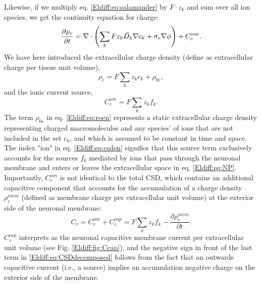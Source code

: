 Likewise, if we multiply eq. \ref{Eldiff:eq:salamander} by $F\cdot z_k$ and sum over all ion species, we get the continuity equation for charge: 
\begin{equation}
\frac{\partial \rho_e}{\partial t} =  \nabla \cdot \left (\sum_k{F z_k \tilde{D_k}{\bf \nabla} c_{k}} + \sigma_e\nabla\phi  \right)  + C_e^{ion}.
\label{Eldiff:eq:chargecontinuity}
\end{equation}
We have here introduced the extracellular charge density (define as extracellular charge per tissue unit volume), 
\begin{equation}
\rho_e = F \sum_k z_k c_k + \rho_{0e},  
\label{Eldiff:eq:roen}
\end{equation}
and the ionic current source, 
\begin{equation}
C_e^{ion} = F \sum_k z_k f_k. 
\label{Eldiff:eq:csden}
\end{equation}
The term $\rho_{0e}$ in eq. \ref{Eldiff:eq:roen} represents a static extracellular charge density representing charged macromolecules and any species' of ions that are not included in the set $c_k$, and which is assumed to be constant in time and space. The index "ion" in eq. \ref{Eldiff:eq:csden} signifies that this source term exclusively accounts for the sources $f_k$ mediated by ions that pass through the neuronal membrane and enters or leaves the extracellular space in eq. \ref{Eldiff:eq:NP}. Importantly, $C_e^{ion}$ is not identical to the total CSD, which contains an additional capacitive component that accounts for the accumulation of a charge density $\rho_e^{mem}$ (defined as membrane charge per extracellular unit volume) at the exterior side of the neuronal membrane:
\begin{equation}
C_e = C_e^{ion} + C_e^{cap} = F \sum_k z_k f_k - \frac{\partial \rho_{e}^{mem}}{\partial t}.
\label{Eldiff:eq:CSDdecomposed}
\end{equation}
$C_e^{cap}$ interprets as the neuronal capacitive membrane current per extracellular unit volume (see Fig. \ref{Eldiff:fig:Ccap}), and the negative sign in front of the last term in \ref{Eldiff:eq:CSDdecomposed} follows from the fact that an outwards capacitive current (i.e., a source) implies an accumulation negative charge on the exterior side of the membrane. 

